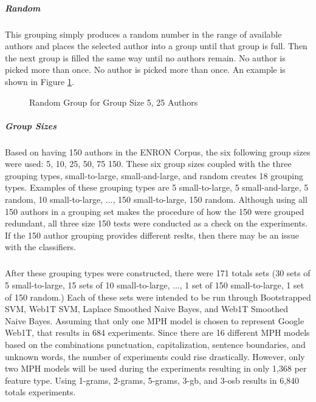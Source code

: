 		\subparagraph{Random} This grouping simply produces a random number in the range of available authors and places the selected author into a group until that group is full.  Then the next group is filled the same way until no authors remain.  No author is picked more than once. No author is picked more than once. An example is shown in Figure \ref{fig:randomGrouping}.
		\begin{figure}[ht!]
			\begin{center}
				\caption{Random Group for Group Size 5, 25 Authors}
				\label{fig:randomGrouping}
			\end{center}
		\end{figure}
		\subparagraph{Group Sizes} Based on having 150 authors in the ENRON Corpus, the six following group sizes were used: 5, 10, 25, 50, 75 150.  These six group sizes coupled with the three grouping types, small-to-large, small-and-large, and random creates 18 grouping types.  Examples of these grouping types are 5 small-to-large, 5 small-and-large, 5 random, 10 small-to-large, ..., 150 small-to-large, 150 random.  Although using all 150 authors in a grouping set makes the procedure of how the 150 were grouped redundant, all three size 150 tests were conducted as a check on the experiments. If the 150 author grouping provides different reslts, then there may be an issue with the classifiers.
		\subparagraph{}After these grouping types were constructed, there were 171 totals sets (30 sets of 5 small-to-large, 15 sets of 10 small-to-large, ..., 1 set of 150 small-to-large, 1 set of 150 random.)  Each of these sets were intended to be run through Bootstrapped SVM, Web1T SVM, Laplace Smoothed Naive Bayes, and Web1T Smoothed Naive Bayes.  Assuming that only one MPH model is chosen to represent Google Web1T, that results in 684 experiments.  Since there are 16 different MPH models based on the combinations punctuation, capitalization, sentence boundaries, and unknown words, the number of experiments could rise drastically.  However, only two MPH models will be used during the experiments resulting in only 1,368 per feature type.  Using 1-grams, 2-grams, 5-grams, 3-gb, and 3-osb results in 6,840 totals experiments.
	
